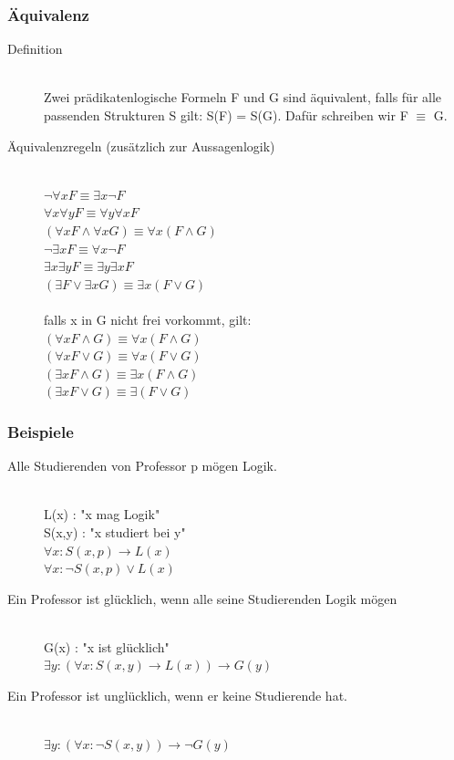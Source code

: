 \documentclass[a4paper,10pt]{article}
\newcommand{\ra}{\rightarrow}
\begin{document}
\subsubsection{\"Aquivalenz}
\begin{description}
	\item[Definition] \hfill \\
		Zwei pr\"adikatenlogische Formeln F und G sind \"aquivalent, falls f\"ur alle passenden Strukturen S gilt: S(F) = S(G). Daf\"ur schreiben wir F $\equiv$ G.
	\item[\"Aquivalenzregeln (zus\"atzlich zur Aussagenlogik)] \hfill \\
		$\neg \forall x F \equiv \exists x \neg F$ \\
		$\forall x \forall y F \equiv \forall y \forall x F$ \\
		$(\forall x F \wedge \forall x G) \equiv \forall x (F \wedge G)$ \\
		$\neg \exists x F \equiv \forall x \neg F$ \\		
		$\exists x \exists y F \equiv \exists y \exists x F$ \\
		$(\exists F \vee \exists x G) \equiv \exists x (F \vee G)$ \\ \\
		falls x in G nicht frei vorkommt, gilt: \\
		$(\forall x F \wedge G) \equiv \forall x (F \wedge G)$ \\
		$(\forall x F \vee G) \equiv \forall x (F \vee G)$ \\
		$(\exists x F \wedge G) \equiv \exists x (F \wedge G)$ \\
		$(\exists x F \vee G) \equiv \exists (F \vee G)$ \\
\end{description}

\subsubsection{Beispiele}
\begin{description}
	\item[Alle Studierenden von Professor p m\"ogen Logik.] \hfill \\
		L(x) : "x mag Logik" \\
		S(x,y) : "x studiert bei y" \\
		$\forall x: S(x,p) \ra L(x)$ \\
		$\forall x: \neg S(x,p) \vee L(x)$
	\item[Ein Professor ist gl\"ucklich, wenn alle seine Studierenden Logik m\"ogen] \hfill \\
		G(x) : "x ist gl\"ucklich" \\
		$\exists y: (\forall x : S(x,y) \ra L(x)) \ra G(y)$
	\item[Ein Professor ist ungl\"ucklich, wenn er keine Studierende hat.] \hfill \\
		$\exists y: (\forall x : \neg S(x,y)) \ra \neg G(y)$
\end{description}
\end{document}
